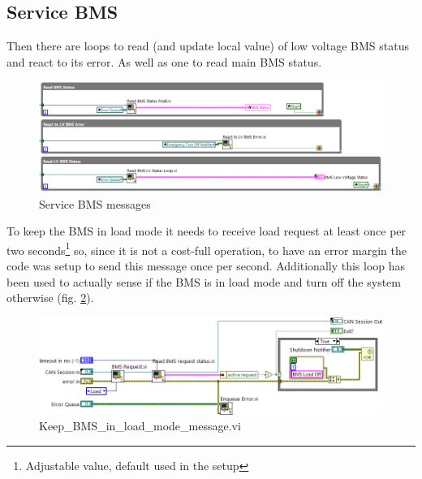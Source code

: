 \subsection{Service BMS}
Then there are loops to read (and update local value) of low voltage BMS status and react to its error. As well as one to read main BMS status.
\begin{figure}[H]
    \centering
    \includegraphics[width=\textwidth]{figures/Read_BMSs.png}
    \caption{Service BMS messages}
    \label{BMSs_status}
\end{figure}
To keep the BMS in load mode it needs to receive load request at least once per two seconds\footnote{Adjustable value, default used in the setup} so, since it is not a cost-full operation, to have an error margin the code was setup to send this message once per second.
Additionally this loop has been used to actually sense if the BMS is in load mode and turn off the system otherwise (fig. \ref{vi:Keep_BMS_in_load_mode_message}).
\begin{figure}[H]
    \centering
    \includegraphics[width=\textwidth]{figures/Keep_BMS_in_load_mode_messaged}
    \caption{Keep\_BMS\_in\_load\_mode\_message.vi}
    \label{vi:Keep_BMS_in_load_mode_message}
\end{figure}

